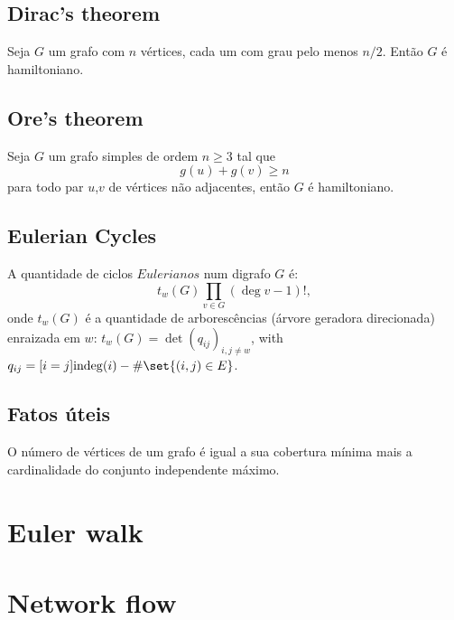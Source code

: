 \subsection{Dirac's theorem} Seja $G$ um grafo com $n$ vértices, cada um com grau pelo menos $n/2$. Então $G$ é hamiltoniano.

\subsection{Ore's theorem} Seja $G$ um grafo simples de ordem $n \geq 3$ tal que 
\[g(u) + g(v) \geq n \] para todo par $u$,$v$ de vértices não adjacentes, então $G$ é hamiltoniano.\newline

\subsection{Eulerian Cycles}
A quantidade de ciclos $Eulerianos$ num digrafo $G$ é:\newline
		\begin{equation*}
			t_w(G) \prod_{v \in G} (\deg v - 1)!,
		\end{equation*}\newline
		onde $t_w(G)$ é a quantidade de arborescências (árvore geradora direcionada) enraizada em $w$: $t_w(G) = \det\left( q_{ij} \right)_{i,j \neq w}$, with $q_{ij} = [i=j] \mathrm{indeg}(i) - \# \set{(i,j) \in E}$.\newline
	
\subsection{Fatos úteis}
O número de vértices de um grafo é igual a sua cobertura mínima mais a cardinalidade do conjunto independente máximo.\\

\section{Euler walk}

\section{Network flow}
    \newline    
